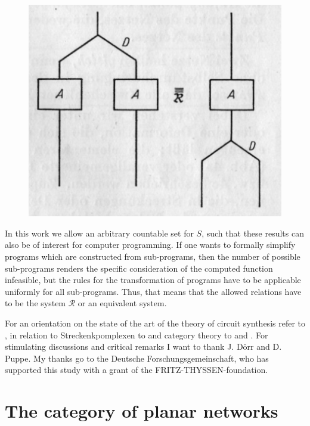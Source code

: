 \documentclass{article}
\begin{document}
\begin{figure}
\includegraphics[]{figure2.png}
\caption{}
\label{fig:figure2}
\end{figure}

In this work we allow an arbitrary countable set for $S$, such that these results can also be of interest for computer programming. If one wants to formally simplify programs which are constructed from sub-programs, then the number of possible sub-programs renders the specific consideration of the computed function infeasible, but the rules for the transformation of programs have to be applicable uniformly for all sub-programs. Thus, that means that the allowed relations have to be the system
$\mathcal{R}$ or an equivalent system.

For an orientation on the state of the art of the theory of circuit synthesis refer to \cite{circuit-synthesis}, in relation to Streckenkpomplexen to \cite{combinatory-topology} and category theory to \cite{categories-functors} and \cite{category-theory}.
For stimulating discussions and critical remarks I want to thank J. D\"{o}rr and D. Puppe. My thanks go to the Deutsche Forschungsgemeinschaft, who has supported this study with a grant of the FRITZ-THYSSEN-foundation.

\section{The category of planar networks }
\end{document}

